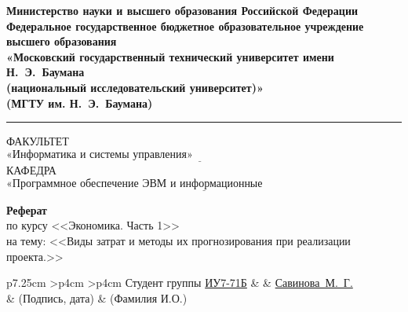 \documentclass{bmstu}
\newenvironment{signstabular}[1][1]{
	\renewcommand*{\arraystretch}{#1}
	\tabular
}{
	\endtabular
}
\begin{document}
	\begin{titlepage}
		\fontsize{12pt}{12pt}\selectfont
		\noindent \begin{minipage}{0.15\textwidth}
		\end{minipage}
		\noindent\begin{minipage}{0.9\textwidth}\centering
			\textbf{Министерство науки и высшего образования Российской Федерации}\\
			\textbf{Федеральное государственное бюджетное образовательное учреждение высшего образования}\\
			\textbf{«Московский государственный технический университет имени Н.~Э.~Баумана}\\
			\textbf{(национальный исследовательский университет)»}\\
			\textbf{(МГТУ им. Н.~Э.~Баумана)}
		\end{minipage}
		
		\noindent\rule{18cm}{3pt}
		\newline\newline
		\noindent ФАКУЛЬТЕТ $\underline{\text{«Информатика и системы управления»~~~~~~~~~~~~~~~~~~~~~~~~~~~~~~~~~~~~~~~~~~~~~~~~~~~~~~~}}$ \newline\newline
		\noindent КАФЕДРА $\underline{\text{«Программное обеспечение ЭВМ и информационные технологии»~~~~~~~~~~~~~~~~~~~~~~~}}$\newline\newline\newline\newline\newline\newline\newline
		
		\begin{center}
			\textbf{\large Реферат} \\
			\large по курсу <<Экономика. Часть 1>> \\
			на тему: <<Виды затрат и методы их прогнозирования при реализации проекта.>>
		\end{center}
		
		\vfill
		\vfill
		\vfill
		\vfill
		
		\begin{table}[h!]
			\fontsize{12pt}{0.7\baselineskip}\selectfont
			\centering
			\begin{signstabular}[0.7]{p{7.25cm} >{\centering\arraybackslash}p{4cm} >{\centering\arraybackslash}p{4cm}}
				Студент группы \uline{ИУ7-71Б} & \uline{\mbox{\hspace*{4cm}}} & \uline{\hfill Савинова~М.~Г. \hfill} \\
				& \scriptsize (Подпись, дата) & \scriptsize (Фамилия И.О.)
			\end{signstabular}
			

\end{table}
\end{titlepage}
\end{document}
